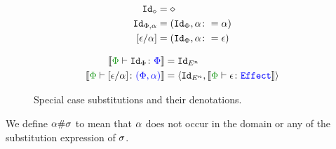 \begin{figure}[H]
    \centering
    \begin{minipage}{.45\linewidth}
        \begin{framed}
            \begin{align*}
                \Id{\nil} & = \nil\\
                \Id{\P,\a} & = (\Id{\P}, \a\setto\a)\\
                \ssub{\a}{\e} & = (\Id{\P}, \a\setto \e)
            \end{align*}
        \end{framed}
    \end{minipage}
    \quad
    \begin{minipage}{.45\linewidth}
        \begin{framed}
            \begin{align*}
                \deno{\typerelation{\P}{\Id{\P}}{\P}} & = \Id{E^n}\\
                \deno{\typerelation{\P}{\ssub{\a}{\e}}{(\P,\a)}} & = \pr{\Id{E^n}}{\deno{\typerelation{\P}{\e}{\effect}}}
                \\
            \end{align*}
        \end{framed}
    \end{minipage}
    \caption{Special case substitutions and their denotations.}
    \label{EffectSpecialSubs}
\end{figure}

\begin{framed}
    \begin{definition}[Freshness]\label{EffectFreshness}
      We define $\alpha \# \sigma$ to mean that $\alpha$ does not occur in the domain or any of the substitution expression of $\sigma$.
    \end{definition}
\end{framed}

